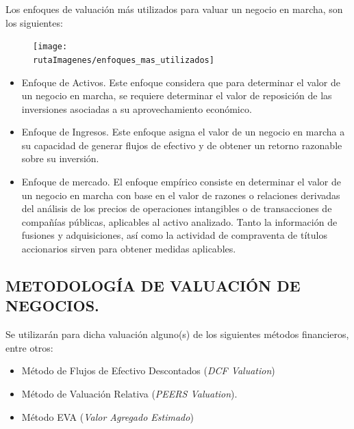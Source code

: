 \documentclass[5pt,letter]{article}
\begin{document}
Los enfoques de valuación más utilizados para valuar un negocio en marcha, son los
 siguientes:
 
 \begin{figure}[H]
 \centering
 \texttt{[image: \\rutaImagenes/enfoques\_mas\_utilizados]}
 \end{figure}
 
 \begin{itemize}
 
\item  Enfoque de Activos. Este enfoque considera que para determinar el valor de un negocio en
 marcha, se requiere determinar el valor de reposición de las inversiones asociadas a su
 aprovechamiento económico.
 

\item Enfoque de Ingresos. Este enfoque asigna el valor de un negocio en marcha a su capacidad
 de generar flujos de efectivo y de obtener un retorno razonable sobre su inversión.
 
\item  Enfoque de mercado. El enfoque empírico consiste en determinar el valor de un negocio en
marcha con base en el valor de razones o relaciones derivadas del análisis de los precios de
operaciones intangibles o de transacciones de compañías públicas, aplicables al activo
analizado. Tanto la información de fusiones y adquisiciones, así como la actividad de
compraventa de títulos accionarios sirven para obtener medidas aplicables.

\end{itemize}

 \begin{center}
 \section{METODOLOGÍA DE VALUACIÓN DE NEGOCIOS.}
 \end{center}
 
 Se utilizarán para dicha valuación alguno(s) de los siguientes métodos financieros, entre
otros:\\	
 
\begin{itemize}
\item Método de Flujos de Efectivo Descontados (\textit{DCF Valuation})
\item Método de Valuación Relativa (\textit{PEERS Valuation}).
\item Método EVA (\textit{Valor Agregado Estimado})
\end{itemize}
\end{document}
